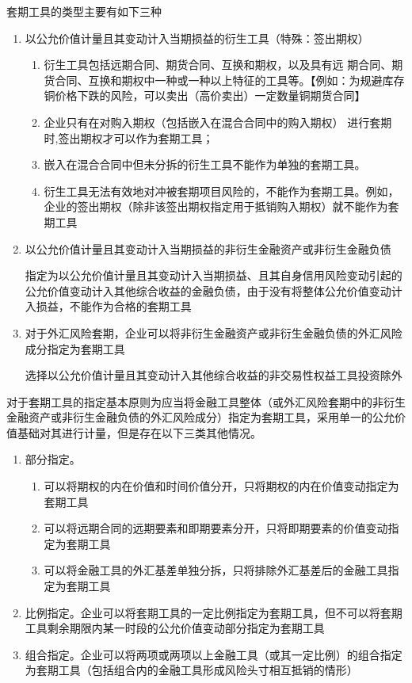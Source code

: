 \documentclass[UTF8,12pt]{ctexart}
\numberwithin{equation}{section} %
\numberwithin{figure}{section}
\numberwithin{table}{section}
\begin{document}
	套期工具的类型主要有如下三种
	\begin{enumerate}
		\item 以公允价值计量且其变动计入当期损益的衍生工具（特殊：签出期权）
		\begin{enumerate}
			\item 衍生工具包括远期合同、期货合同、互换和期权，以及具有远 期合同、期货合同、互换和期权中一种或一种以上特征的工具等。【例如：为规避库存铜价格下跌的风险，可以卖出（高价卖出）一定数量铜期货合同】
			\item 企业只有在对购入期权（包括嵌入在混合合同中的购入期权） 进行套期时,签出期权才可以作为套期工具；
			\item 嵌入在混合合同中但未分拆的衍生工具不能作为单独的套期工具。
			\item 衍生工具无法有效地对冲被套期项目风险的，不能作为套期工具。例如，企业的签出期权（除非该签出期权指定用于抵销购入期权）就不能作为套期工具
			
		\end{enumerate}
		
		\item 以公允价值计量且其变动计入当期损益的非衍生金融资产或非衍生金融负债
		
		指定为以公允价值计量且其变动计入当期损益、且其自身信用风险变动引起的公允价值变动计入其他综合收益的金融负债，由于没有将整体公允价值变动计入损益，不能作为合格的套期工具
		
		\item 对于外汇风险套期，企业可以将非衍生金融资产或非衍生金融负债的外汇风险成分指定为套期工具
		
		选择以公允价值计量且其变动计入其他综合收益的非交易性权益工具投资除外
		
	\end{enumerate}

	对于套期工具的指定基本原则为应当将金融工具整体（或外汇风险套期中的非衍生金融资产或非衍生金融负债的外汇风险成分）指定为套期工具，采用单一的公允价值基础对其进行计量，但是存在以下三类其他情况。
	\begin{enumerate}
		\item 部分指定。
		\begin{enumerate}
			\item 可以将期权的内在价值和时间价值分开，只将期权的内在价值变动指定为套期工具
			
			\item 可以将远期合同的远期要素和即期要素分开，只将即期要素的价值变动指定为套期工具
			
			\item 可以将金融工具的外汇基差单独分拆，只将排除外汇基差后的金融工具指定为套期工具
			
		\end{enumerate}
		
		\item 比例指定。企业可以将套期工具的一定比例指定为套期工具，但不可以将套期工具剩余期限内某一时段的公允价值变动部分指定为套期工具
		
		\item 组合指定。企业可以将两项或两项以上金融工具（或其一定比例）的组合指定为套期工具（包括组合内的金融工具形成风险头寸相互抵销的情形）
	\end{enumerate}
	
\end{document}

